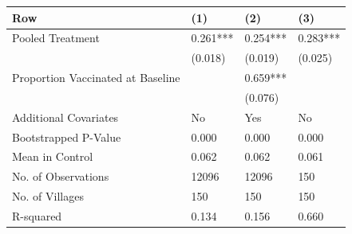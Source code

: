 
\begin{tabular}{llll}
\toprule
Row & (1) & (2) & (3)\\
\midrule
Pooled Treatment & 0.261*** & 0.254*** & 0.283***\\
 & (0.018) & (0.019) & (0.025)\\
Proportion Vaccinated at Baseline &  & 0.659*** & \\
 &  & (0.076) & \\
Additional Covariates & No & Yes & No\\
\addlinespace
Bootstrapped P-Value & 0.000 & 0.000 & 0.000\\
Mean in Control & 0.062 & 0.062 & 0.061\\
No. of Observations & 12096 & 12096 & 150\\
No. of Villages & 150 & 150 & 150\\
R-squared & 0.134 & 0.156 & 0.660\\
\bottomrule
\end{tabular}
